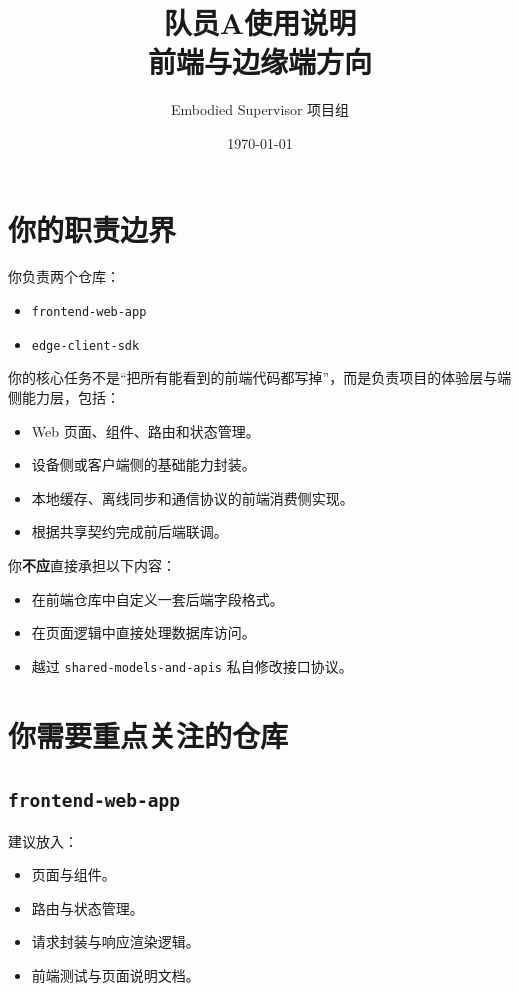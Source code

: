 \documentclass[11pt,a4paper]{ctexart}
\title{队员A使用说明\\前端与边缘端方向}
\author{Embodied Supervisor 项目组}
\date{\today}
\begin{document}
\maketitle

\section{你的职责边界}

你负责两个仓库：

\begin{itemize}
  \item \texttt{frontend-web-app}
  \item \texttt{edge-client-sdk}
\end{itemize}

你的核心任务不是“把所有能看到的前端代码都写掉”，而是负责项目的体验层与端侧能力层，包括：

\begin{itemize}
  \item Web 页面、组件、路由和状态管理。
  \item 设备侧或客户端侧的基础能力封装。
  \item 本地缓存、离线同步和通信协议的前端消费侧实现。
  \item 根据共享契约完成前后端联调。
\end{itemize}

你\textbf{不应}直接承担以下内容：

\begin{itemize}
  \item 在前端仓库中自定义一套后端字段格式。
  \item 在页面逻辑中直接处理数据库访问。
  \item 越过 \texttt{shared-models-and-apis} 私自修改接口协议。
\end{itemize}

\section{你需要重点关注的仓库}

\subsection{\texttt{frontend-web-app}}

建议放入：

\begin{itemize}
  \item 页面与组件。
  \item 路由与状态管理。
  \item 请求封装与响应渲染逻辑。
  \item 前端测试与页面说明文档。
\end{itemize}
\end{document}
